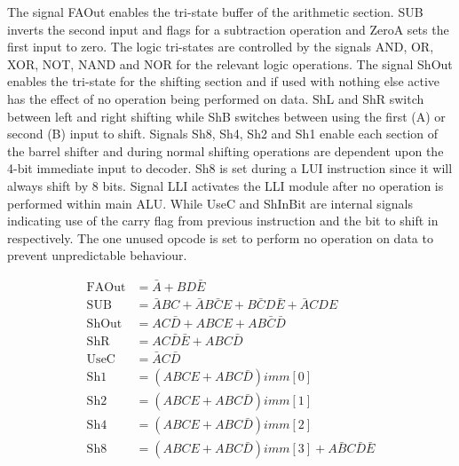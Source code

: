 The signal FAOut enables the tri-state buffer of the arithmetic section. 
SUB inverts the second input and flags for a subtraction operation and ZeroA sets the first input to zero. 
The logic tri-states are controlled by the signals AND, OR, XOR, NOT, NAND and NOR for the relevant logic operations. 
The signal ShOut enables the tri-state for the shifting section and if used with nothing else active has the effect of no operation being performed on data. 
ShL and ShR switch between left and right shifting while ShB switches between using the first (A) or second (B) input to shift. 
Signals Sh8, Sh4, Sh2 and Sh1 enable each section of the barrel shifter and during normal shifting operations are dependent upon the 4-bit immediate input to decoder. 
Sh8 is set during a LUI instruction since it will always shift by 8 bits. 
Signal LLI activates the LLI module after no operation is performed within main ALU. 
While UseC and ShInBit are internal signals indicating use of the carry flag from previous instruction and the bit to shift in respectively. 
The one unused opcode is set to perform no operation on data to prevent unpredictable behaviour. 

\begin{align}
	\text{FAOut} &= \bar{A} + BD\bar{E} \label{eq:DecBasicS}\\
	\text{SUB} &= \bar{A}BC + \bar{A}B\bar{C}E + B\bar{C}D\bar{E} + \bar{A}CDE \\
	\text{ShOut} &= AC\bar{D} + ABCE + AB\bar{C}\bar{D} \\
	\text{ShR} &= AC\bar{D}\bar{E} + ABC\bar{D} \\
	\text{UseC} &= \bar{A}C\bar{D} \\
	\text{Sh1} &= (ABCE + ABC\bar{D})imm[0] \\
	\text{Sh2} &= (ABCE + ABC\bar{D})imm[1] \\
	\text{Sh4} &= (ABCE + ABC\bar{D})imm[2] \\
	\text{Sh8} &= (ABCE + ABC\bar{D})imm[3] + A\bar{B}C\bar{D}\bar{E} \label{eq:DecBasicF}
\end{align}

